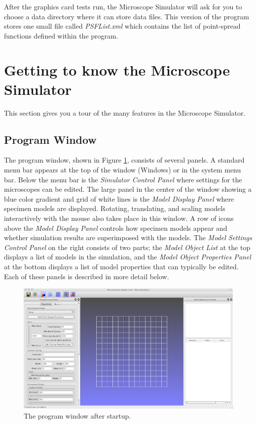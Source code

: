 \documentclass[11pt,titlepage]{article}
\begin{document}
After the graphics card tests run, the Microscope Simulator will ask for you to choose a data directory where it can store data files. This version of the program stores one small file called \emph{PSFList.xml} which contains the list of point-spread functions defined within the program.

\section{Getting to know the Microscope Simulator}

This section gives you a tour of the many features in the Microscope Simulator.

\subsection{Program Window}

The program window, shown in Figure \ref{fig:ProgramWindow}, consists of several panels. A standard menu bar appears at the top of the window (Windows) or in the system menu bar. Below the menu bar is the \emph{Simulator Control Panel} where settings for the microscopes can be edited. The large panel in the center of the window showing a blue color gradient and grid of white lines is the \emph{Model Display Panel} where specimen models are displayed. Rotating, translating, and scaling models interactively with the mouse also takes place in this window. A row of icons above the \emph{Model Display Panel} controls how specimen models appear and whether simulation results are superimposed with the models. The \emph{Model Settings Control Panel} on the right consists of two parts; the \emph{Model Object List} at the top displays a list of models in the simulation, and the \emph{Model Object Properties Panel} at the bottom displays a list of model properties that can typically be edited. Each of these panels is described in more detail below.

\begin{figure}[htbp] %
   \centering
   \includegraphics[width=1\linewidth]{images/ProgramWindow-small} 
   \caption{The program window after startup.}
   \label{fig:ProgramWindow}
\end{figure}
\end{document}
